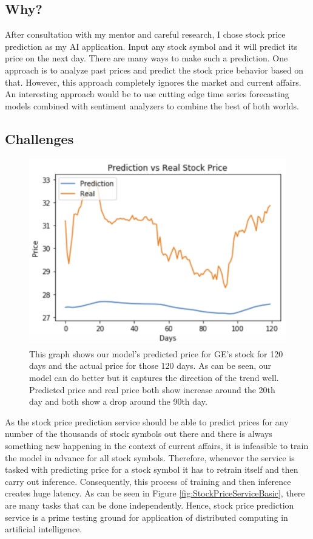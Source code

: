 \documentclass{report}
\begin{document}
\subsection{Why?}

After consultation with my mentor and careful research, I chose stock price prediction as my AI application. Input any stock symbol and it will predict its price on the next day. There are many ways to make such a prediction. One approach is to analyze past prices and predict the stock price behavior based on that. However, this approach completely ignores the market and current affairs. An interesting approach would be to use cutting edge time series forecasting models combined with sentiment analyzers to combine the best of both worlds.

\subsection{Challenges}

\begin{figure}
  \includegraphics[width=\textwidth]{PredictionRealPrice.png}
  \caption{This graph shows our model's predicted price for GE's stock for 120 days and the actual price for those 120 days. As can be seen, our model can do better but it captures the direction of the trend well. Predicted price and real price both show increase around the 20th day and both show a drop around the 90th day.}
  \label{fig:PredictionRealPrice}
\end{figure}

As the stock price prediction service should be able to predict prices for any number of the thousands of stock symbols out there and there is always something new happening in the context of current affairs, it is infeasible to train the model in advance for all stock symbols.
Therefore, whenever the service is tasked with predicting price for a stock symbol it has to retrain itself and then carry out inference.
Consequently, this process of training and then inference creates huge latency.
As can be seen in Figure \ref{fig:StockPriceServiceBasic}, there are many tasks that can be done independently.
Hence, stock price prediction service is a prime testing ground for application of distributed computing in artificial intelligence.
\end{document}
